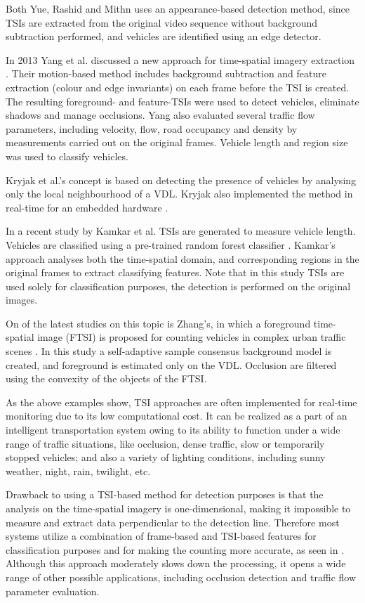 Both Yue, Rashid and Mithn uses an appearance-based detection method, since TSIs are extracted from the original video sequence without background subtraction performed, and vehicles are identified using an edge detector.

In 2013 Yang et al. discussed a new approach for time-spatial imagery extraction \cite{Yang2013a}.
Their motion-based method includes background subtraction and feature extraction (colour and edge invariants) on each frame before the TSI is created.
The resulting foreground- and feature-TSIs were used to detect vehicles, eliminate shadows and manage occlusions.
Yang also evaluated several traffic flow parameters, including velocity, flow, road occupancy and density by measurements carried out on the original frames. 
Vehicle length and region size was used to classify vehicles.

Kryjak et al.'s concept is based on detecting the presence of vehicles by analysing only the local neighbourhood of a VDL.
Kryjak also implemented the method in real-time for an embedded hardware \cite{Kryjak2014}.

In a recent study by Kamkar et al. TSIs are generated to measure vehicle length. Vehicles are classified using a pre-trained random forest classifier \cite{Kamkar2016}. 
Kamkar's approach analyses both the time-spatial domain, and corresponding regions in the original frames to extract classifying features.
Note that in this study TSIs are used solely for classification purposes, the detection is performed on the original images.

On of the latest studies on this topic is Zhang's, in which a foreground time-spatial image (FTSI) is proposed for counting vehicles in complex urban traffic scenes \cite{Zhang2016}.
In this study a self-adaptive sample consensus background model is created, and foreground is estimated only on the VDL.
Occlusion are filtered using the convexity of the objects of the FTSI.

As the above examples show, TSI approaches are often implemented for real-time monitoring due to its low computational cost.
It can be realized as a part of an intelligent transportation system owing to its ability to function under a wide range of traffic situations, like occlusion, dense traffic, slow or temporarily stopped vehicles; and also a variety of lighting conditions, including sunny weather, night, rain, twilight, etc.

Drawback to using a TSI-based method for detection purposes is that the analysis on the time-spatial imagery is one-dimensional, making it impossible to measure and extract data perpendicular to the detection line.
Therefore most systems utilize a combination of frame-based and TSI-based features for classification purposes and for making the counting more accurate, as seen in \cite{Kryjak2014, Yang2013a}. 
Although this approach moderately slows down the processing, it opens a wide range of other possible applications, including occlusion detection and traffic flow parameter evaluation.

